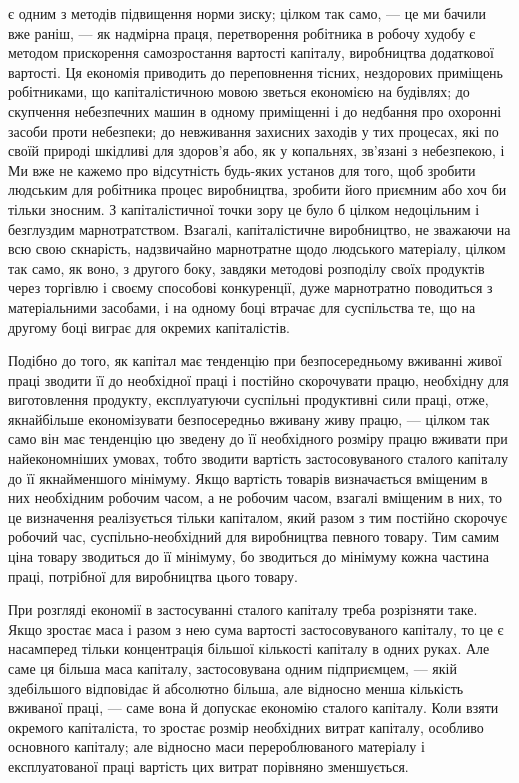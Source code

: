 \parcont{}  %
є одним з методів підвищення норми зиску; цілком так само, —
це ми бачили вже раніш, — як надмірна праця, перетворення
робітника в робочу худобу є методом прискорення самозростання вартості капіталу, виробництва
додаткової вартості.
Ця економія приводить до переповнення тісних, нездорових приміщень робітниками, що капіталістичною
мовою зветься економією на будівлях; до скупчення небезпечних машин в
одному приміщенні і до недбання про охоронні засоби проти
небезпеки; до невживання захисних заходів у тих процесах,
які по своїй природі шкідливі для здоров’я або, як у копальнях, зв’язані з небезпекою, і~ Ми
вже не кажемо про відсутність будь-яких установ для того, щоб зробити людським для
робітника процес виробництва, зробити його приємним або хоч би
тільки зносним. З капіталістичної точки зору це було б цілком
недоцільним і безглуздим марнотратством. Взагалі, капіталістичне
виробництво, не зважаючи на всю свою скнарість, надзвичайно
марнотратне щодо людського матеріалу, цілком так само, як
воно, з другого боку, завдяки методові розподілу своїх продуктів через торгівлю і своєму способові
конкуренції, дуже марнотратно поводиться з матеріальними засобами, і на одному боці втрачає для
суспільства те, що на другому боці виграє для
окремих капіталістів.

Подібно до того, як капітал має тенденцію при безпосередньому вживанні живої праці зводити її до
необхідної праці і постійно скорочувати працю, необхідну для виготовлення продукту,
експлуатуючи суспільні продуктивні сили праці, отже, якнайбільше економізувати безпосередньо вживану
живу працю, —
цілком так само він має тенденцію цю зведену до її необхідного
розміру працю вживати при найекономніших умовах, тобто зводити вартість застосовуваного сталого
капіталу до її якнайменшого мінімуму. Якщо вартість товарів визначається вміщеним
в них необхідним робочим часом, а не робочим часом, взагалі
вміщеним в них, то це визначення реалізується тільки капіталом,
який разом з тим постійно скорочує робочий час, суспільно-необхідний
для виробництва певного товару. Тим самим ціна
товару зводиться до її мінімуму, бо зводиться до мінімуму кожна
частина праці, потрібної для виробництва цього товару.

При розгляді економії в застосуванні сталого капіталу треба
розрізняти таке. Якщо зростає маса і разом з нею сума вартості застосовуваного капіталу, то це є
насамперед тільки концентрація більшої кількості капіталу в одних руках. Але саме
ця більша маса капіталу, застосовувана одним підприємцем, —
якій здебільшого відповідає й абсолютно більша, але відносно
менша кількість вживаної праці, — саме вона й допускає економію сталого капіталу. Коли взяти
окремого капіталіста, то
зростає розмір необхідних витрат капіталу, особливо основного
капіталу; але відносно маси перероблюваного матеріалу і експлуатованої праці вартість цих витрат
порівняно зменшується.
